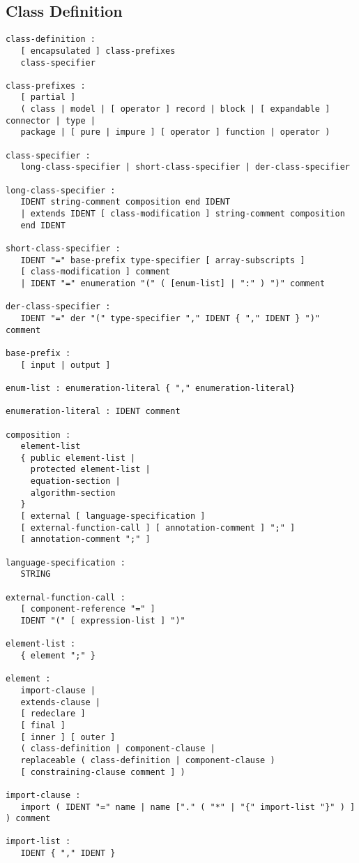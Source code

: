 \subsection{Class Definition}
\begin{lstlisting}[language=grammar]
class-definition :
   [ encapsulated ] class-prefixes
   class-specifier

class-prefixes :
   [ partial ]
   ( class | model | [ operator ] record | block | [ expandable ] connector | type |
   package | [ pure | impure ] [ operator ] function | operator )

class-specifier :
   long-class-specifier | short-class-specifier | der-class-specifier

long-class-specifier :
   IDENT string-comment composition end IDENT
   | extends IDENT [ class-modification ] string-comment composition
   end IDENT

short-class-specifier :
   IDENT "=" base-prefix type-specifier [ array-subscripts ]
   [ class-modification ] comment
   | IDENT "=" enumeration "(" ( [enum-list] | ":" ) ")" comment

der-class-specifier :
   IDENT "=" der "(" type-specifier "," IDENT { "," IDENT } ")" comment

base-prefix :
   [ input | output ]

enum-list : enumeration-literal { "," enumeration-literal}

enumeration-literal : IDENT comment

composition :
   element-list
   { public element-list |
     protected element-list |
     equation-section |
     algorithm-section
   }
   [ external [ language-specification ]
   [ external-function-call ] [ annotation-comment ] ";" ]
   [ annotation-comment ";" ]

language-specification :
   STRING

external-function-call :
   [ component-reference "=" ]
   IDENT "(" [ expression-list ] ")"

element-list :
   { element ";" }

element :
   import-clause |
   extends-clause |
   [ redeclare ]
   [ final ]
   [ inner ] [ outer ]
   ( class-definition | component-clause |
   replaceable ( class-definition | component-clause )
   [ constraining-clause comment ] )

import-clause :
   import ( IDENT "=" name | name ["." ( "*" | "{" import-list "}" ) ] ) comment

import-list :
   IDENT { "," IDENT }
\end{lstlisting}

